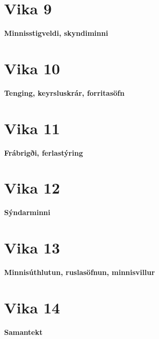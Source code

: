 \documentclass{article}
\begin{document}
\section{Vika 9}
\large{\textbf{Minnisstigveldi, skyndiminni}}


\section{Vika 10}
\large{\textbf{Tenging, keyrsluskrár, forritasöfn}}


\section{Vika 11}
\large{\textbf{Frábrigði, ferlastýring}}

\section{Vika 12}
\large{\textbf{Sýndarminni}}

\section{Vika 13}
\large{\textbf{Minnisúthlutun, ruslasöfnun, minnisvillur}}


\section{Vika 14}
\large{\textbf{Samantekt}}
\end{document}

